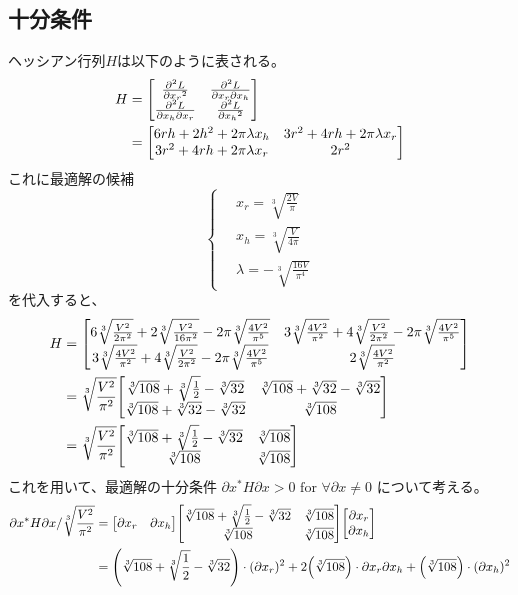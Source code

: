 \documentclass{jsarticle}
\begin{document}
\subsection{十分条件}
ヘッシアン行列$H$は以下のように表される。
\begin{align}
  H &=
  \mqty[
  \pdv[2]{L}{{x_r}} & \pdv{L}{{x_r}}{{x_h}} \\
  \pdv{L}{{x_h}}{{x_r}} & \pdv[2]{L}{{x_h}} \\
  ]
  \\&=
  \mqty[
  6rh+2h^2+2\pi\lambda {x_h} & 3r^2+4rh+2\pi\lambda {x_r} \\
  3r^2+4rh+2\pi\lambda {x_r} & 2r^2 \\
  ]
\end{align}
これに最適解の候補
\begin{equation}
  \left\{ \,
  \begin{aligned}
     & {x_r} = \sqrt[3]{\frac{2V}{\pi}} \\
     & {x_h} = \sqrt[3]{\frac{V}{4\pi}} \\
     & \lambda = -\sqrt[3]{\frac{16V}{\pi^4}}
  \end{aligned}
  \right.
  \label{eq:canditate}
\end{equation}
を代入すると、
\begin{align}
  H&=
  \mqty[
  6\sqrt[3]{\frac{V^2}{2\pi^2}} + 2\sqrt[3]{\frac{V^2}{16\pi^2}} - 2\pi\sqrt[3]{\frac{4V^2}{\pi^5}} &
  3\sqrt[3]{\frac{4V^2}{\pi^2}} + 4\sqrt[3]{\frac{V^2}{2\pi^2}} - 2\pi\sqrt[3]{\frac{4V^2}{\pi^5}} \\
  3\sqrt[3]{\frac{4V^2}{\pi^2}} + 4\sqrt[3]{\frac{V^2}{2\pi^2}} - 2\pi\sqrt[3]{\frac{4V^2}{\pi^5}} &
  2\sqrt[3]{\frac{4V^2}{\pi^2}}
  ]\\
  &= \sqrt[3]{\frac{V^2}{\pi^2}}
  \mqty[
  \sqrt[3]{108} + \sqrt[3]{\frac{1}{2}} - \sqrt[3]{32} &
  \sqrt[3]{108} + \sqrt[3]{32} - \sqrt[3]{32} \\
  \sqrt[3]{108} + \sqrt[3]{32} - \sqrt[3]{32} &
  \sqrt[3]{108}
  ]\\
  &= \sqrt[3]{\frac{V^2}{\pi^2}}
  \mqty[
  \sqrt[3]{108} + \sqrt[3]{\frac{1}{2}} - \sqrt[3]{32} &
  \sqrt[3]{108} \\
  \sqrt[3]{108} &
  \sqrt[3]{108}
  ]
  \label{eq:H-val}
\end{align}
これを用いて、最適解の十分条件
$\partial{x}^*H\partial{x}>0 \text{ for }\forall\partial x\neq 0$
について考える。
\begin{align}
  \partial{x}^*H\partial{x}
  / \sqrt[3]{\frac{V^2}{\pi^2}}
  &= 
  \mqty[\partial{{x_r}} & \partial{{x_h}}]
  \mqty[
  \sqrt[3]{108} + \sqrt[3]{\frac{1}{2}} - \sqrt[3]{32} &
  \sqrt[3]{108} \\
  \sqrt[3]{108} &
  \sqrt[3]{108}
  ]
  \mqty[\partial{{x_r}} \\ \partial{{x_h}}] \\
  &=
  \qty(\sqrt[3]{108} + \sqrt[3]{\frac{1}{2}} - \sqrt[3]{32}) \cdot (\partial{{x_r}})^2
  + 2\qty(\sqrt[3]{108}) \cdot \partial{{x_r}}\partial{{x_h}}
  + \qty(\sqrt[3]{108}) \cdot (\partial{{x_h}})^2
\end{align}
\end{document}
